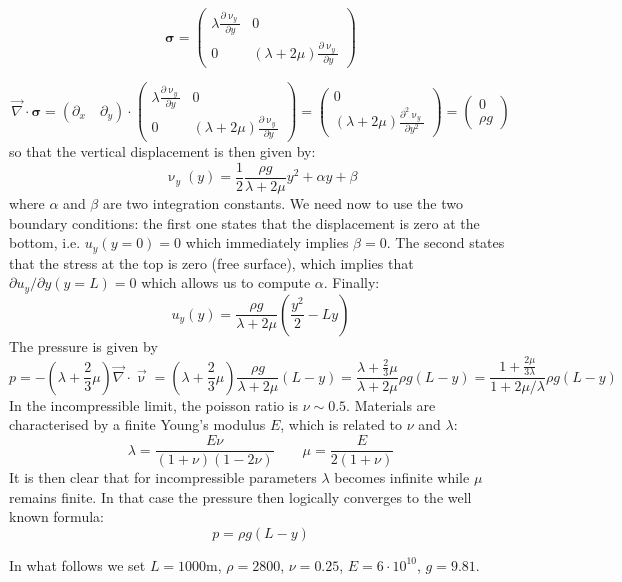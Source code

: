\[
{\bm \sigma} =
\left(
\begin{array}{cc}
\lambda \frac{\partial \upnu_y}{\partial y} &  0 \\
0 & (\lambda + 2 \mu) \frac{\partial \upnu_y}{\partial y}
\end{array}
\right)
\]

\[
{\vec \nabla}\cdot {\bm \sigma} =
(\partial_x \quad \partial_y)\cdot 
\left(
\begin{array}{cc}
\lambda \frac{\partial \upnu_y}{\partial y} &  0 \\
0 & (\lambda + 2 \mu) \frac{\partial \upnu_y}{\partial y}
\end{array}
\right)
=
\left(
\begin{array}{c}
0 \\
(\lambda + 2 \mu) \frac{\partial^2 \upnu_y}{\partial y^2}
\end{array}
\right)
=
\left(
\begin{array}{c}
0 \\
\rho g
\end{array}
\right)
\]
so that the vertical displacement is then given by:
\[
\upnu_y(y) = \frac{1}{2} \frac{\rho g}{\lambda + 2 \mu} y^2 + \alpha y + \beta 
\] 
where $\alpha$ and $\beta$ are two integration constants.
We need now to use the two boundary conditions: the first one states that the displacement
is zero at the bottom, i.e. $u_y(y=0)=0$ which immediately implies $\beta=0$.
The second states that the stress at the top is zero (free surface), which implies that 
$\partial u_y/\partial y (y=L)=0$ which allows us to compute $\alpha$.
Finally:
\[
u_y(y) = \frac{\rho g}{\lambda + 2 \mu} (\frac{y^2}{2}-L y) 
\] 
The pressure is given by
\[
p=-(\lambda + \frac{2}{3} \mu) {\vec \nabla}\cdot{\vec\upnu}
= (\lambda + \frac{2}{3} \mu)  \frac{\rho g}{\lambda + 2 \mu} (L -y)
= \frac{\lambda + \frac{2}{3} \mu}{\lambda + 2 \mu} \rho g (L-y)  
= \frac{1 + \frac{2 \mu}{3 \lambda} }{1 + 2 \mu/\lambda} \rho g (L-y)  
\]
In the incompressible limit, the poisson ratio is $\nu \sim 0.5$. 
Materials are characterised by a finite Young's modulus $E$, which is related to 
$\nu$ and $\lambda$:
\[
\lambda=\frac{E \nu}{(1+\nu)(1-2\nu)}
\quad\quad
\mu=\frac{E}{2(1+\nu)}
\]
It is then clear that for incompressible parameters $\lambda$ becomes 
infinite while $\mu$ remains finite. In that case the pressure 
then logically converges to the well known formula:
\[
p=\rho g (L-y)
\]

In what follows we set $L=1000$m, $\rho=2800$, $\nu=0.25$, $E=6\cdot10^{10}$, $g=9.81$.

